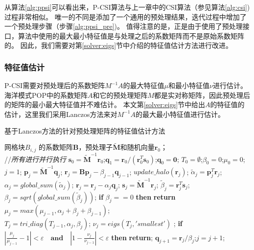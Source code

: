 从算法\ref{alg:ppsi}可以看出来，P-CSI算法与上一章中的CSI算法（参见算法\ref{alg:csi})过程非常相似。
唯一的不同是添加了一个通用的预处理结果，迭代过程中增加了一个预处理步骤（步骤\ref{alg:ppsi_pre})。 
值得注意的是，正是由于使用了预处理接口，算法中使用的最大最小特征值是与处理之后的系数矩阵而不是原始系数矩阵的。 
因此，我们需要对第\ref{solver:eigs}节中介绍的特征值估计方法进行改进。


\subsubsection{特征值估计}
\label{precond:pcsi:eigs}
P-CSI需要对预处理后的系数矩阵$M^{-1}A$的最大特征值$\mu$和最小特征值$\nu$进行估计。 
海洋模式POP中的系数矩阵$A$和它的预处理矩阵$M$都是实对称矩阵，因此预处理后的矩阵的最小最大特征值并不难估计。 
本文第\ref{solver:eigs}节中给出$A$的特征值的估计，这里我们采用Lanczos方法\cite{Paige1980235}来对$M^{-1}A$的最大最小特征值进行估计。


\begin{algorithm}[!ht]
\caption{基于Lanczos方法的针对预处理矩阵的特征值估计方法}
\label{alg:lanczos_pre}
\begin{algorithmic}[1]
\REQUIRE 网格块$B_{i,j}$ 的系数矩阵$\textbf{B}$，预处理子$\tilde{\textbf{M}}$和随机向量$\textbf{r}_0$； \\
 //\qquad    \textit{所有进行并行执行}
\STATE $\textbf{s}_0=\tilde{\textbf{M}}^{-1}\textbf{r}_0$;\quad $\textbf{q}_1 = \textbf{r}_0/({\textbf{r}_0^T\textbf{s}_0})$;\quad $\textbf{q}_0=\textbf{0}$;
\STATE $T_0=\emptyset$;\quad $\beta_0 =0$;\quad  $\mu_0 =0$;\quad $j=1$;
\STATE $\textbf{p}_j = \tilde{\textbf{M}}^{-1}\textbf{q}_j$; \quad $\textbf{r}_j=\textbf{B}\textbf{p}_j-\beta_{j-1}\textbf{q}_{j-1}$;
\STATE $update\_halo(\textbf{r}_j)$;
\STATE $\tilde{\alpha}_j =\textbf{p}_j^T\textbf{r}_j$; \quad $\alpha_j=global\_sum(\tilde{\alpha}_j)$;
\STATE $\textbf{r}_j=\textbf{r}_j-\alpha_{j}\textbf{q}_{j}$; \quad $\textbf{s}_j = \tilde{\textbf{M}}^{-1}\textbf{r}_j$;
\STATE $\tilde{\beta}_j = \textbf{r}_j^T\textbf{s}_j$; \quad $\beta_j=sqrt(global\_sum(\tilde{\beta}_j))$;
\STATE \textbf{if} $\beta_j == 0$ \textbf{then} \textbf{return}
\STATE $\mu_j = max(\mu_{j-1},\alpha_j+\beta_j+\beta_{j-1})$; \label{lan_gersh}\\
\STATE $T_j=tri\_diag(T_{j-1},\alpha_j,\beta_j)$; \label{lan_tm}
\STATE $\nu_j = eigs(T_j,'smallest')$ ; \label{lan_nu}
\STATE \textbf{if} $|\frac{\mu_j}{\mu_{j-1}} -1 |< \varepsilon\quad\textbf{and}\quad|1- \frac{\nu_j}{\nu_{j-1}}|< \varepsilon$ \textbf{then} \textbf{return}; \label{lanczos_converge}
\STATE $\textbf{q}_{j+1}= \textbf{r}_j/\beta_j$;\quad $j=j+1$;
\ENDWHILE
\end{algorithmic}
\end{algorithm}

